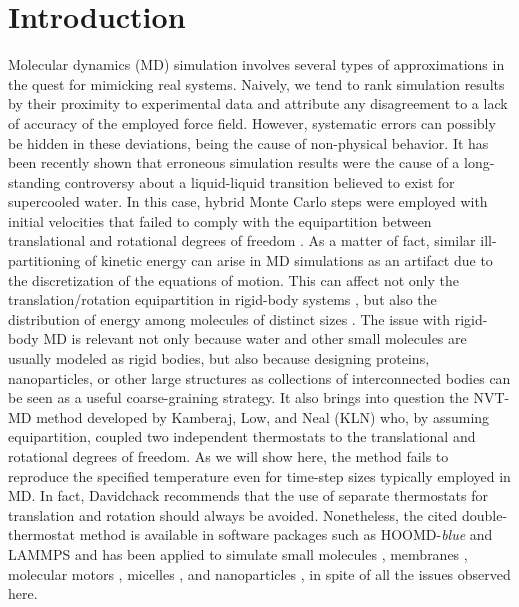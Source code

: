 \documentclass[
	aip,
	jcp,
	reprint,
]{revtex4-1}
\begin{document}
\section{Introduction}

Molecular dynamics (MD) simulation involves several types of approximations in the quest for mimicking real systems.
Naively, we tend to rank simulation results by their proximity to experimental data and attribute any disagreement to a lack of accuracy of the employed force field.
However, systematic errors can possibly be hidden in these deviations, being the cause of non-physical behavior.
It has been recently shown \cite{Palmer_2018} that erroneous simulation results \cite{Limmer_2011, Limmer_2013} were the cause of a long-standing controversy \cite{Smart_2018} about a liquid-liquid transition believed to exist for supercooled water.
In this case, hybrid Monte Carlo steps were employed with initial velocities that failed to comply with the equipartition between translational and rotational degrees of freedom \cite{Palmer_2018}.
As a matter of fact, similar ill-partitioning of kinetic energy can arise in MD simulations as an artifact due to the discretization of the equations of motion.
This can affect not only the translation/rotation equipartition in rigid-body systems \cite{Davidchack_2010, Silveira_2017}, but also the distribution of energy among molecules of distinct sizes \cite{Eastwood_2010}.
The issue with rigid-body MD is relevant not only because water \cite{Jorgensen_1983} and other small molecules are usually modeled as rigid bodies, but also because designing proteins, nanoparticles, or other large structures as collections of interconnected bodies \cite{Miller_2002, Knorowski_2012, Patra_2013} can be seen as a useful coarse-graining strategy.
It also brings into question the NVT-MD method developed by Kamberaj, Low, and Neal \cite{Kamberaj_2005} (KLN) who, by assuming equipartition, coupled two independent thermostats to the translational and rotational degrees of freedom.
As we will show here, the method fails to reproduce the specified temperature even for time-step sizes typically employed in MD.
In fact, Davidchack \cite{Davidchack_2010} recommends that the use of separate thermostats for translation and rotation should always be avoided.
Nonetheless, the cited double-thermostat method is available in software packages such as HOOMD-\textit{blue}\cite{Anderson_2008} and LAMMPS\cite{Plimpton_1995} and has been applied to simulate small molecules \cite{Geiger_2013, Aimoli_2014, Aimoli_2014_2}, membranes \cite{Bucior_2012}, molecular motors \cite{Akimov_2012}, micelles \cite{Yan_2008}, and nanoparticles \cite{Patra_2014}, in spite of all the issues observed here.
\end{document}
